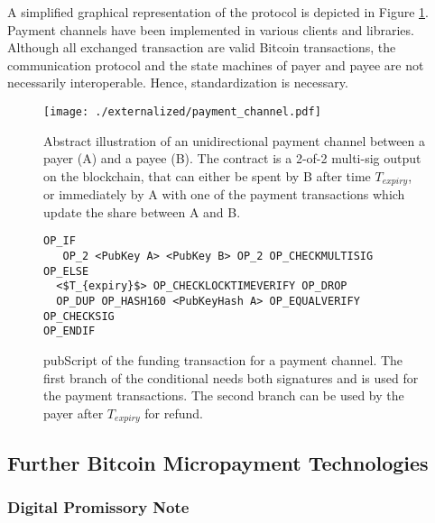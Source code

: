 A simplified graphical representation of the protocol is depicted in Figure \ref{fig:paymentchannels}. Payment channels have been implemented in various clients and libraries. Although all exchanged transaction are valid Bitcoin transactions, the communication protocol and the state machines of payer and payee are not necessarily interoperable. Hence, standardization is necessary.


\begin{figure}
\centering
\texttt{[image: ./externalized/payment\_channel.pdf]}
\caption{Abstract illustration of an unidirectional payment channel between a payer (A) and a payee (B). The contract is a 2-of-2 multi-sig output on the blockchain, that can either be spent by B after time $T_{expiry}$, or immediately by A with one of the payment transactions which update the share between A and B.}
\label{fig:paymentchannels}
\end{figure}

\begin{figure}
\begin{lstlisting}[breaklines,mathescape=true]
OP_IF
   OP_2 <PubKey A> <PubKey B> OP_2 OP_CHECKMULTISIG
OP_ELSE
  <$T_{expiry}$> OP_CHECKLOCKTIMEVERIFY OP_DROP
  OP_DUP OP_HASH160 <PubKeyHash A> OP_EQUALVERIFY OP_CHECKSIG
OP_ENDIF
\end{lstlisting} 
\caption{pubScript of the funding transaction for a payment channel. The first branch of the conditional needs both signatures and is used for the payment transactions. The second branch can be used by the payer after $T_{expiry}$ for refund.}
\label{fig:pubScriptFunding}
\end{figure}

 \subsection{Further Bitcoin Micropayment Technologies}

 \subsubsection{Digital Promissory Note}

